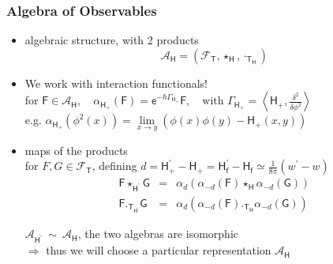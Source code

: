 \documentclass[9pt]{beamer}
\newcommand{\TdotH}{\cdot_{\Tsf_\Hsf}} %
\newcommand{\Smearip}[1]{\left\langle #1 \right\rangle} %
\newcommand{\E}{\mathsf{e}} %
\newcommand{\Acal}{\mathcal{A}}
\newcommand{\Fcal}{\mathcal{F}}
\newcommand{\Fsf}{\mathsf{F}}
\newcommand{\Gsf}{\mathsf{G}}
\newcommand{\Hsf}{\mathsf{H}}
\newcommand{\Tsf}{\mathsf{T}}
\newcommand{\fsf}{\mathsf{f}}
\begin{document}

\begin{frame}
 
\frametitle{Algebra of Observables}

\begin{itemize}
 
\item algebraic structure, with 2 products
\vspace*{-12pt}
\begin{equation*}
\Acal_{\Hsf} = \left( \Fcal_{\Tsf} , \star_\Hsf , \TdotH \right)
\end{equation*}

\item We work with interaction functionals! \\
for $\Fsf \in \Acal_{\Hsf}, \quad
\alpha_{\Hsf_+}(\Fsf) = \E^{-\hbar \Gamma_{\Hsf_+}} \Fsf, \quad \mbox{with } \Gamma_{\Hsf_+} = \Smearip{\Hsf_+,\frac{\delta^2}{\delta\phi^2}}  $ \\
e.g. 
$ \alpha_{\Hsf_+}(\phi^2(x)) = \underset{x\to y}{\lim} \left( \phi(x)\phi(y) - \Hsf_+(x,y) \right)$

\item maps of the products \\
for $F, G \in \Fcal_{\Tsf}$, defining $d = \Hsf_+^\prime - \Hsf_+ = \Hsf_\fsf^\prime - \Hsf_\fsf \simeq \frac{1}{8\pi}\left( w^\prime - w \right)$
\vspace*{-4pt}
\begin{eqnarray*}
\Fsf \star_{\Hsf^\prime} \Gsf &=& \alpha_d \left( \alpha_{-d}(\Fsf) \star_\Hsf \alpha_{-d}(\Gsf) \right) \\ 
\Fsf ._{\Tsf_{\Hsf^\prime}} \Gsf &=& \alpha_d \left( \alpha_{-d}(\Fsf) ._{\Tsf_\Hsf} \alpha_{-d}(\Gsf) \right) 
\end{eqnarray*}

\vspace*{-9pt}

\begin{block}{}
\vspace*{-14pt}
\begin{center}
$\Acal_{\Hsf^\prime} \ \sim \ \Acal_{\Hsf}$, the two algebras are isomorphic \\
$\Rightarrow$ thus we will choose a particular representation $\Acal_{\Hsf}$
\end{center}
\vspace*{-5pt}
\end{block}

 


\end{itemize}



\end{frame}
\end{document}
